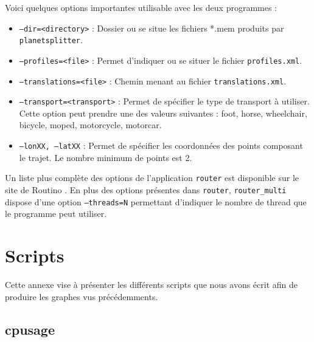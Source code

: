 \begin{appendices}
  Voici quelques options importantes utilisable avec les deux programmes : \\
  
  \begin{itemize}
    \renewcommand{\labelitemi}{$\bullet$}
  \item \texttt{--dir=<directory>} : Dossier ou se situe les fichiers *.mem
    produits par \texttt{planetsplitter}.
  \item \texttt{--profiles=<file>} : Permet d'indiquer ou se situer le 
    fichier \texttt{profiles.xml}.
  \item \texttt{--translations=<file>} : Chemin menant au fichier 
    \texttt{translations.xml}.
  \item \texttt{--transport=<transport>} : Permet de spécifier le type de 
    transport à utiliser. Cette option peut prendre une des valeurs suivantes 
    : foot, horse, wheelchair, bicycle, moped, motorcycle, motorcar.
  \item \texttt{--lonXX, --latXX} : Permet de spécifier les coordonnées des 
    points composant le trajet. Le nombre minimum de points est 2. \\
  \end{itemize}

  Un liste plus complète des options de l'application \texttt{router} est
  disponible sur le site de Routino \cite{bishop_routino_????}. En plus des 
  options présentes dans \texttt{router}, \texttt{router\_multi} dispose d'une 
  option \texttt{--threads=N} permettant d'indiquer le nombre de thread que le 
  programme peut utiliser.
  
  \section{Scripts}
  \label{ann:scripts}
  
  Cette annexe vise à présenter les différents scripts que nous avons écrit 
  afin de produire les graphes vus précédemments.

  \subsection{cpusage}
  \label{ann:cpusage}
  

\end{appendices}
